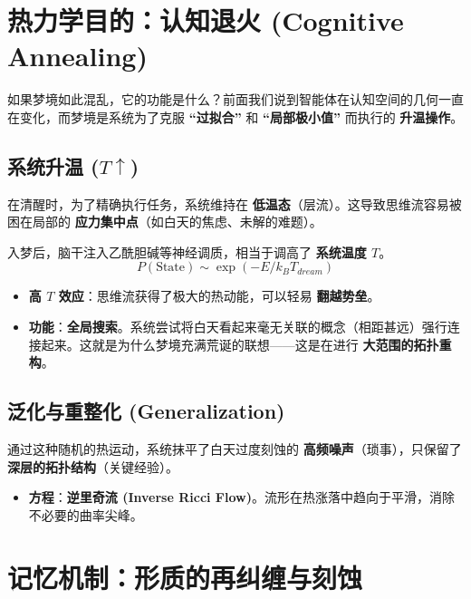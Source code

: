 \section{热力学目的：认知退火 (Cognitive Annealing)}
\label{sec:section_5559}

如果梦境如此混乱，它的功能是什么？前面我们说到智能体在认知空间的几何一直在变化，而梦境是系统为了克服 \textbf{“过拟合”} 和 \textbf{“局部极小值”} 而执行的 \textbf{升温操作}。

\subsection{系统升温 ($T \uparrow$)}

在清醒时，为了精确执行任务，系统维持在 \textbf{低温态}（层流）。这导致思维流容易被困在局部的 \textbf{应力集中点}（如白天的焦虑、未解的难题）。

入梦后，脑干注入乙酰胆碱等神经调质，相当于调高了 \textbf{系统温度 $T$}。
\begin{equation}
P(\text{State}) \sim \exp(-E/k_B T_{dream})
\end{equation}

\begin{itemize}
    \item \textbf{高 $T$ 效应}：思维流获得了极大的热动能，可以轻易 \textbf{翻越势垒}。
    \item \textbf{功能}：\textbf{全局搜索}。系统尝试将白天看起来毫无关联的概念（相距甚远）强行连接起来。这就是为什么梦境充满荒诞的联想——这是在进行 \textbf{大范围的拓扑重构}。
\end{itemize}

\subsection{泛化与重整化 (Generalization)}

通过这种随机的热运动，系统抹平了白天过度刻蚀的 \textbf{高频噪声}（琐事），只保留了 \textbf{深层的拓扑结构}（关键经验）。

\begin{itemize}
    \item \textbf{方程}：\textbf{逆里奇流 (Inverse Ricci Flow)}。流形在热涨落中趋向于平滑，消除不必要的曲率尖峰。
\end{itemize}

\section{记忆机制：形质的再纠缠与刻蚀}
\label{sec:section_9179}

